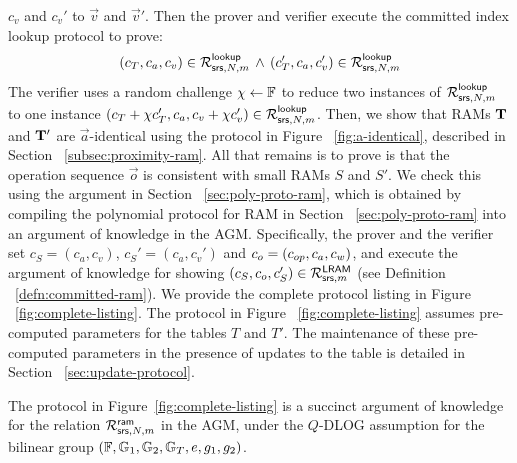$c_v$ and $c_v'$ to $\vec{v}$ and $\vec{v}'$. Then the prover and verifier execute the committed index lookup protocol to
prove:
\begin{equation}
(c_T, c_a, c_v)\in \mathcal{R}^{\mathsf{lookup}}_{\mathsf{srs},N,m}\, \wedge\, (c_T', c_a, c_v')\in \mathcal{R}^{\mathsf{lookup}}_{\mathsf{srs},N,m}
\end{equation}
The verifier uses a random challenge $\chi\gets \mathbb{F}$ to reduce two instances of $\mathcal{R}^{\mathsf{lookup}}_{\mathsf{srs},N,m}$ to one instance
$(c_T + \chi c_T', c_a, c_v + \chi c_v')\in \mathcal{R}^{\mathsf{lookup}}_{\mathsf{srs},N,m}$. Then, we show that
RAMs $\mathbf{T}$ and $\mathbf{T}'$ are $\vec{a}$-identical using the protocol in Figure ~\ref{fig:a-identical}, described
in Section ~\ref{subsec:proximity-ram}.
All that remains is to prove is that the operation sequence $\vec{o}$ is consistent with small RAMs $S$ and $S'$.
We check this using the argument in Section ~\ref{sec:poly-proto-ram}, which is obtained by compiling the
polynomial protocol for RAM in Section ~\ref{sec:poly-proto-ram} into an argument of knowledge in the AGM.
Specifically, the prover and the verifier set
$c_S = (c_a, c_v)$, $c_S'=(c_a, c_v')$ and $c_o = (c_{op}, c_a, c_w)$, and execute the argument of knowledge for
showing $(c_S, c_o, c_S')\in \mathcal{R}^{\mathsf{LRAM}}_{\mathsf{srs},m}$ (see Definition ~\ref{defn:committed-ram}). We provide the complete protocol
listing in Figure ~\ref{fig:complete-listing}. The protocol in Figure ~\ref{fig:complete-listing} assumes pre-computed parameters
for the tables $T$ and $T'$. The maintenance of these pre-computed parameters in the presence of updates to the table
is detailed in Section ~\ref{sec:update-protocol}.

\begin{theorem}\label{thm:committed-ram}
The protocol in Figure~\ref{fig:complete-listing} is a succinct argument of knowledge for the relation $\mathcal{R}^{\mathsf{ram}}_{\mathsf{srs},N,m}$ in
the AGM, under the $Q$-DLOG assumption for the bilinear group $(\mathbb{F},\mathbb{G}_1,\mathbb{G}_2,\mathbb{G}_T,e,g_1,g_2)$.
\end{theorem}

